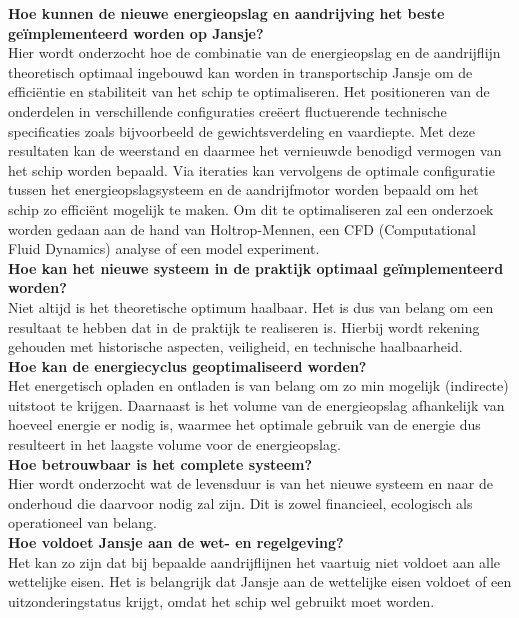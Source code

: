 \noindent\textbf{Hoe kunnen de nieuwe energieopslag en aandrijving het beste geïmplementeerd worden op Jansje?}\\
    Hier wordt onderzocht hoe de combinatie van de energieopslag en de aandrijflijn theoretisch optimaal ingebouwd kan worden in transportschip Jansje om de efficiëntie en stabiliteit van het schip te optimaliseren. Het positioneren van de onderdelen in verschillende configuraties creëert fluctuerende technische specificaties zoals bijvoorbeeld de gewichtsverdeling en vaardiepte. Met deze resultaten kan de weerstand en daarmee het vernieuwde benodigd vermogen van het schip worden bepaald. Via iteraties kan vervolgens de optimale configuratie tussen het energieopslagsysteem en de aandrijfmotor worden bepaald om het schip zo efficiënt mogelijk te maken. Om dit te optimaliseren zal een onderzoek worden gedaan aan de hand van Holtrop-Mennen, een CFD (Computational Fluid Dynamics) analyse of een model experiment.\\
    
\noindent\textbf{Hoe kan het nieuwe systeem in de praktijk optimaal geïmplementeerd worden?}\\
    Niet altijd is het theoretische optimum haalbaar. Het is dus van belang om een resultaat te hebben dat in de praktijk te realiseren is. Hierbij wordt rekening gehouden met historische aspecten, veiligheid, en technische haalbaarheid.\\
    
\noindent\textbf{Hoe kan de energiecyclus geoptimaliseerd worden?} \\
   Het energetisch opladen en ontladen is van belang om zo min mogelijk (indirecte) uitstoot te krijgen. Daarnaast is het volume van de energieopslag afhankelijk van hoeveel energie er nodig is, waarmee het optimale gebruik van de energie dus resulteert in het laagste volume voor de energieopslag.\\
   
\noindent\textbf{Hoe betrouwbaar is het complete systeem?} \\
    Hier wordt onderzocht wat de levensduur is van het nieuwe systeem en naar de onderhoud die daarvoor nodig zal zijn. Dit is zowel financieel, ecologisch als operationeel van belang. \\
    
\noindent\textbf{Hoe voldoet Jansje aan de wet- en regelgeving?} \\
    Het kan zo zijn dat bij bepaalde aandrijflijnen het vaartuig niet voldoet aan alle wettelijke eisen. Het is belangrijk dat Jansje aan de wettelijke eisen voldoet of een uitzonderingstatus krijgt, omdat het schip wel gebruikt moet worden.\\

